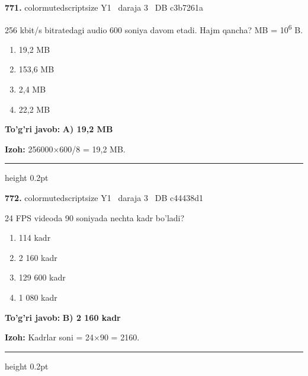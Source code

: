 \documentclass[10pt,a4paper,oneside]{article}
\begin{document}
\noindent\textbf{\color{ink}771.}  {color{muted}scriptsize Y1 \textbullet\ daraja 3 \textbullet\ DB c3b7261a}
\par
256 kbit/s bitratedagi audio 600 soniya davom etadi. Hajm qancha? MB = 10\textsuperscript{6} B.
\begin{enumerate}[label=\Alph*),leftmargin=9mm]
\item 19,2 MB
\item 153,6 MB
\item 2,4 MB
\item 22,2 MB
\end{enumerate}
\begin{tcolorbox}[enhanced,breakable,colback=teal!4,colframe=teal!50!black,boxrule=0.5pt,arc=1.1mm,left=3mm,right=3mm,top=1.7mm,bottom=1.7mm,before skip=2mm,after skip=2mm]
\textbf{\color{teal}To'g'ri javob:} \textbf{A) 19,2 MB}
\par\smallskip
\textbf{Izoh:} 256000\ensuremath{\times}600/8 = 19,2 MB.
\end{tcolorbox}
\vspace{2mm}\hrule height 0.2pt \vspace{3mm}

\noindent\textbf{\color{ink}772.}  {color{muted}scriptsize Y1 \textbullet\ daraja 3 \textbullet\ DB c44438d1}
\par
24 FPS videoda 90 soniyada nechta kadr bo'ladi?
\begin{enumerate}[label=\Alph*),leftmargin=9mm]
\item 114 kadr
\item 2 160 kadr
\item 129 600 kadr
\item 1 080 kadr
\end{enumerate}
\begin{tcolorbox}[enhanced,breakable,colback=teal!4,colframe=teal!50!black,boxrule=0.5pt,arc=1.1mm,left=3mm,right=3mm,top=1.7mm,bottom=1.7mm,before skip=2mm,after skip=2mm]
\textbf{\color{teal}To'g'ri javob:} \textbf{B) 2 160 kadr}
\par\smallskip
\textbf{Izoh:} Kadrlar soni = 24\ensuremath{\times}90 = 2160.
\end{tcolorbox}
\vspace{2mm}\hrule height 0.2pt \vspace{3mm}
\end{document}

